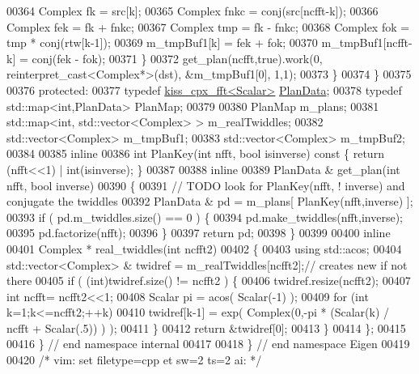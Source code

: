 \begin{DoxyCode}
00364           Complex fk = src[k];
00365           Complex fnkc = conj(src[ncfft-k]);
00366           Complex fek = fk + fnkc;
00367           Complex tmp = fk - fnkc;
00368           Complex fok = tmp * conj(rtw[k-1]);
00369           m\_tmpBuf1[k] = fek + fok;
00370           m\_tmpBuf1[ncfft-k] = conj(fek - fok);
00371         \}
00372         get\_plan(ncfft,\textcolor{keyword}{true}).work(0, reinterpret\_cast<Complex*>(dst), &m\_tmpBuf1[0], 1,1);
00373       \}
00374     \}
00375 
00376   \textcolor{keyword}{protected}:
00377   \textcolor{keyword}{typedef} \hyperlink{struct_eigen_1_1internal_1_1kiss__cpx__fft}{kiss\_cpx\_fft<Scalar>} \hyperlink{struct_eigen_1_1internal_1_1kiss__cpx__fft}{PlanData};
00378   \textcolor{keyword}{typedef} std::map<int,PlanData> PlanMap;
00379 
00380   PlanMap m\_plans;
00381   std::map<int, std::vector<Complex> > m\_realTwiddles;
00382   std::vector<Complex> m\_tmpBuf1;
00383   std::vector<Complex> m\_tmpBuf2;
00384 
00385   \textcolor{keyword}{inline}
00386     \textcolor{keywordtype}{int} PlanKey(\textcolor{keywordtype}{int} nfft, \textcolor{keywordtype}{bool} isinverse)\textcolor{keyword}{ const }\{ \textcolor{keywordflow}{return} (nfft<<1) | int(isinverse); \}
00387 
00388   \textcolor{keyword}{inline}
00389     PlanData & get\_plan(\textcolor{keywordtype}{int} nfft, \textcolor{keywordtype}{bool} inverse)
00390     \{
00391       \textcolor{comment}{// TODO look for PlanKey(nfft, ! inverse) and conjugate the twiddles}
00392       PlanData & pd = m\_plans[ PlanKey(nfft,inverse) ];
00393       \textcolor{keywordflow}{if} ( pd.m\_twiddles.size() == 0 ) \{
00394         pd.make\_twiddles(nfft,inverse);
00395         pd.factorize(nfft);
00396       \}
00397       \textcolor{keywordflow}{return} pd;
00398     \}
00399 
00400   \textcolor{keyword}{inline}
00401     Complex * real\_twiddles(\textcolor{keywordtype}{int} ncfft2)
00402     \{
00403       \textcolor{keyword}{using} std::acos;
00404       std::vector<Complex> & twidref = m\_realTwiddles[ncfft2];\textcolor{comment}{// creates new if not there}
00405       \textcolor{keywordflow}{if} ( (\textcolor{keywordtype}{int})twidref.size() != ncfft2 ) \{
00406         twidref.resize(ncfft2);
00407         \textcolor{keywordtype}{int} ncfft= ncfft2<<1;
00408         Scalar pi =  acos( Scalar(-1) );
00409         \textcolor{keywordflow}{for} (\textcolor{keywordtype}{int} k=1;k<=ncfft2;++k) 
00410           twidref[k-1] = exp( Complex(0,-pi * (Scalar(k) / ncfft + Scalar(.5)) ) );
00411       \}
00412       \textcolor{keywordflow}{return} &twidref[0];
00413     \}
00414 \};
00415 
00416 \} \textcolor{comment}{// end namespace internal}
00417 
00418 \} \textcolor{comment}{// end namespace Eigen}
00419 
00420 \textcolor{comment}{/* vim: set filetype=cpp et sw=2 ts=2 ai: */}
\end{DoxyCode}
